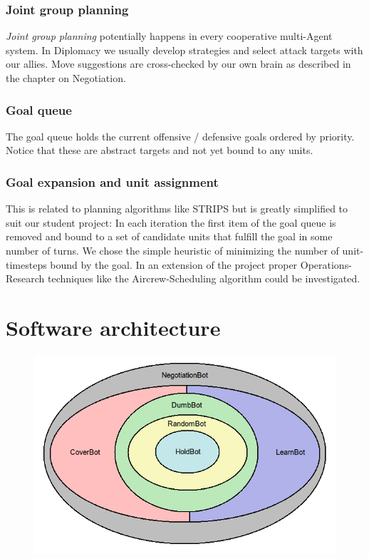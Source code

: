 \documentclass[pdftex,11pt,a4paper]{report}
\begin{document}
\subsection{Joint group planning}
\textit{Joint group planning} potentially happens in every
cooperative multi-Agent system. In Diplomacy we usually develop
strategies and select attack targets with our allies. Move suggestions
are cross-checked by our own brain as described in the chapter
on Negotiation.

\subsection{Goal queue}
The goal queue holds the current offensive / defensive
goals ordered by priority. Notice that these are abstract
targets and not yet bound to any units.

\subsection{Goal expansion and unit assignment}
This is related to planning algorithms like STRIPS but is
greatly simplified to suit our student project: In each iteration
the first item of the goal queue is removed and bound to
a set of candidate units that fulfill the goal in some 
number of turns. We chose the simple heuristic of minimizing
the number of unit-timesteps bound by the goal. In an  
extension of the project proper Operations-Research techniques
like the Aircrew-Scheduling algorithm could be investigated.


\pagebreak

\chapter{Software architecture}

\begin{figure}

\includegraphics[scale=0.75]{./report4_onion.png} \\[1cm]

\end{figure}
\end{document}
